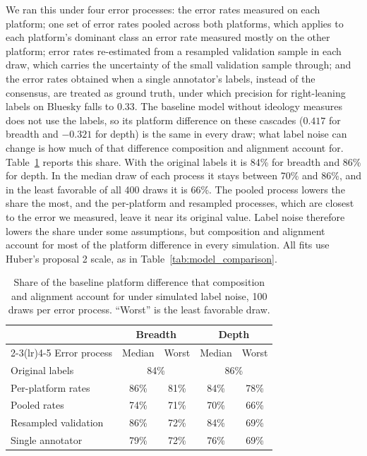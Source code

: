 \documentclass[letterpaper]{article} %
\newcommand{\rev}[1]{{\color{blue}#1}}
\begin{document}
\rev{We ran this under four error processes: the error rates measured on each platform; one set of error rates pooled across both platforms, which applies to each platform's dominant class an error rate measured mostly on the other platform; error rates re-estimated from a resampled validation sample in each draw, which carries the uncertainty of the small validation sample through; and the error rates obtained when a single annotator's labels, instead of the consensus, are treated as ground truth, under which precision for right-leaning labels on Bluesky falls to 0.33. The baseline model without ideology measures does not use the labels, so its platform difference on these cascades ($0.417$ for breadth and $-0.321$ for depth) is the same in every draw; what label noise can change is how much of that difference composition and alignment account for. Table~\ref{tab:noise} reports this share. With the original labels it is 84\% for breadth and 86\% for depth. In the median draw of each process it stays between 70\% and 86\%, and in the least favorable of all 400 draws it is 66\%. The pooled process lowers the share the most, and the per-platform and resampled processes, which are closest to the error we measured, leave it near its original value. Label noise therefore lowers the share under some assumptions, but composition and alignment account for most of the platform difference in every simulation. All fits use Huber's proposal 2 scale, as in Table~\ref{tab:model_comparison}.}

\begin{table}[!t]
\centering
\small
\rev{
\begin{tabular}{lcccc}
\toprule
 & \multicolumn{2}{c}{Breadth} & \multicolumn{2}{c}{Depth} \\
\cmidrule(lr){2-3}\cmidrule(lr){4-5}
Error process & Median & Worst & Median & Worst \\
\midrule
Original labels & \multicolumn{2}{c}{84\%} & \multicolumn{2}{c}{86\%} \\
Per-platform rates & 86\% & 81\% & 84\% & 78\% \\
Pooled rates & 74\% & 71\% & 70\% & 66\% \\
Resampled validation & 86\% & 72\% & 84\% & 69\% \\
Single annotator & 79\% & 72\% & 76\% & 69\% \\
\bottomrule
\end{tabular}
}
\caption{\rev{Share of the baseline platform difference that composition and alignment account for under simulated label noise, 100 draws per error process. ``Worst'' is the least favorable draw.}}
\label{tab:noise}
\end{table}
\end{document}

